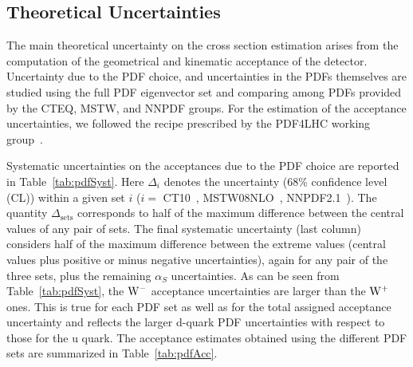 
\subsection{Theoretical Uncertainties}
\label{sec:theory}

The main theoretical uncertainty on the cross section estimation arises from the computation of the
geometrical and kinematic acceptance of the detector.  Uncertainty due to
the PDF choice, and uncertainties in the PDFs themselves are
studied using the full PDF eigenvector set and comparing among PDFs
provided by the CTEQ, MSTW, and NNPDF groups. For the estimation of 
the acceptance uncertainties, we followed the recipe prescribed by the 
PDF4LHC working group~\cite{PDF4LHC}.


Systematic uncertainties on the acceptances due to the PDF choice are
reported in Table~\ref{tab:pdfSyst}.
Here $\Delta_{i}$ denotes the uncertainty (68\% confidence level (CL)) within a given set 
$i$ ($i=$ CT10~\cite{CTEQ10}, MSTW08NLO~\cite{Martin:2009iq}, NNPDF2.1~\cite{NNPDF21}). 
The quantity $\Delta_{\mathrm{sets}}$ corresponds to half of the maximum difference between the central values of any pair of sets. 
The final systematic uncertainty (last column) considers half of the maximum
difference between the extreme values (central values plus positive or minus negative 
uncertainties), again for any pair of the three 
sets, plus the remaining $\alpha_S$ uncertainties.
As can be seen from Table~\ref{tab:pdfSyst}, the $\mathrm{W^-}$ acceptance uncertainties 
are larger than the $\mathrm{W^+}$ ones. This is true for each 
PDF set as well as for the total assigned acceptance uncertainty and reflects the 
larger d-quark PDF uncertainties with respect to those for the u quark.
The acceptance estimates obtained using the different PDF sets are summarized in
Table~\ref{tab:pdfAcc}.

